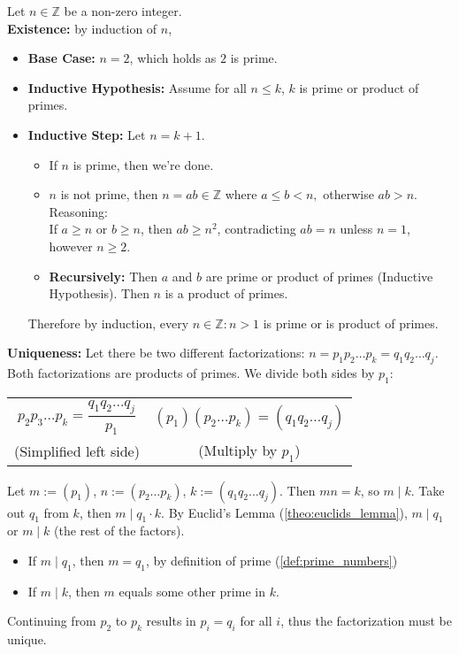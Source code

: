 \begin{Proof}

    Let $n\in\mathbb{Z}$ be a non-zero integer.\\

    \noindent
    \textbf{Existence:} by induction of $n$,
    \begin{itemize}
        \item \textbf{Base Case:} $n=2$, which holds as $2$ is prime.
        \item \textbf{Inductive Hypothesis:} Assume for all $n\leq k$, $k$ is prime or product of primes.
        \item \textbf{Inductive Step:} Let $n=k+1$. 
        \begin{itemize}
            \item If $n$ is prime, then we're done.
            \item $n$ is not prime, then $n=ab\in\mathbb{Z}$ where $a\leq b<n,$ otherwise $ab>n$. Reasoning:\\
                    If \( a \geq n \) or \( b \geq n \), then \( ab \geq n^2 \), contradicting \( ab = n \) unless \( n = 1 \), however \( n \geq 2 \).
            \item \textbf{Recursively:} Then $a$ and $b$ are prime or product of primes (Inductive Hypothesis). Then $n$ is a product of primes.
        \end{itemize}

        \noindent
        Therefore by induction, every $n\in\mathbb{Z}:n>1$ is prime or is product of primes.
    \end{itemize}
    
    \noindent
    \textbf{Uniqueness:} Let there be two different factorizations: $n = p_1p_2\ldots p_k= q_1q_2\ldots q_j$.\\
    Both factorizations are products of primes. We divide both sides by $p_1$:
    \begin{center}
        \begin{tabular}{cc}
            \(p_2p_3\ldots p_k = \dfrac{q_1q_2\ldots q_j}{p_1}\) &  \((p_1)(p_2\ldots p_k) = (q_1q_2\ldots q_j)\) \\
            (Simplified left side) & (Multiply by \(p_1\)) \\
       \end{tabular}
    \end{center}

    \noindent
    Let $m:=(p_1)$, $n:=(p_2\ldots p_k)$, $k:=(q_1q_2\ldots q_j)$. Then $mn=k$, so $m\mid k$. Take
    out $q_1$ from $k$, then $m\mid q_1\cdot k$. By Euclid's Lemma (\ref{theo:euclids_lemma}), $m\mid q_1$ or $m\mid k$ (the rest of the factors).
    \begin{itemize}
        \item If $m\mid q_1$, then $m=q_1$, by definition of prime (\ref{def:prime_numbers})
        \item If $m\mid k$, then $m$ equals some other prime in $k$.
    \end{itemize} 
    Continuing from $p_2$ to $p_k$ results in $p_i=q_i$ for all $i$, thus the factorization must be unique.
\end{Proof}

